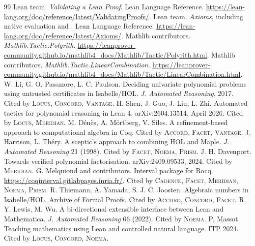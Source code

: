 \documentclass[11pt,a4paper]{article}
\newcommand{\code}[1]{\texttt{\detokenize{#1}}}
\newcommand{\Lc}{\textsc{Locus}}
\newcommand{\Ac}{\textsc{Accord}}
\newcommand{\Cd}{\textsc{Cadence}}
\newcommand{\Cc}{\textsc{Concord}}
\newcommand{\Fc}{\textsc{Facet}}
\newcommand{\Md}{\textsc{Meridian}}
\newcommand{\Nm}{\textsc{Noema}}
\newcommand{\Pm}{\textsc{Prism}}
\newcommand{\Vt}{\textsc{Vantage}}
\theoremstyle{definition}
\begin{document}
\begin{thebibliography}{99}
 Lean team. \emph{Validating a Lean Proof}. Lean Language Reference. \url{https://lean-lang.org/doc/reference/latest/ValidatingProofs/}.
 Lean team. \emph{Axioms}, including native evaluation and \code{native_decide}. Lean Language Reference. \url{https://lean-lang.org/doc/reference/latest/Axioms/}.
 Mathlib contributors. \emph{Mathlib.Tactic.Polyrith}. \url{https://leanprover-community.github.io/mathlib4_docs/Mathlib/Tactic/Polyrith.html}.
 Mathlib contributors. \emph{Mathlib.Tactic.LinearCombination}. \url{https://leanprover-community.github.io/mathlib4_docs/Mathlib/Tactic/LinearCombination.html}.
 W. Li, G. O. Passmore, L. C. Paulson. Deciding univariate polynomial problems using untrusted certificates in Isabelle/HOL. \emph{J. Automated Reasoning}, 2017. Cited by \Lc, \Cc, \Vt.
 H. Shen, J. Guo, J. Liu, L. Zhi. Automated tactics for polynomial reasoning in Lean 4. arXiv:2604.13514, April 2026. Cited by \Lc, \Md.
 M. D\'en\`es, A. M\"ortberg, V. Siles. A refinement-based approach to computational algebra in Coq. Cited by \Ac, \Fc, \Vt.
 J. Harrison, L. Th\'ery. A sceptic's approach to combining HOL and Maple. \emph{J. Automated Reasoning} 21 (1998). Cited by \Fc, \Nm, \Pm.
 J. H. Davenport. Towards verified polynomial factorisation. arXiv:2409.09533, 2024. Cited by \Md.
 G. Melquiond and contributors. Interval package for Rocq. \url{https://coqinterval.gitlabpages.inria.fr/}. Cited by \Cd, \Fc, \Md, \Nm, \Pm.
 R. Thiemann, A. Yamada, S. J. C. Joosten. Algebraic numbers in Isabelle/HOL. Archive of Formal Proofs. Cited by \Ac, \Cc, \Fc.
 R. Y. Lewis, M. Wu. A bi-directional extensible interface between Lean and Mathematica. \emph{J. Automated Reasoning} 66 (2022). Cited by \Nm.
 P. Massot. Teaching mathematics using Lean and controlled natural language. ITP 2024. Cited by \Lc, \Cc, \Nm.
\end{thebibliography}
\end{document}
